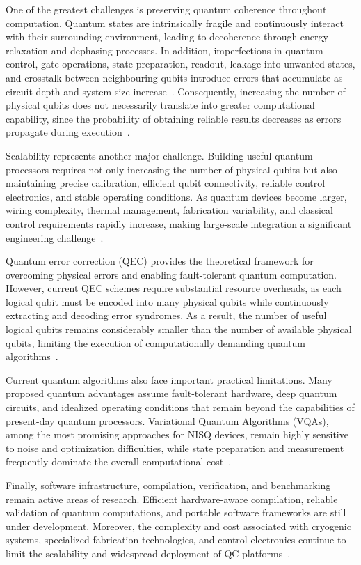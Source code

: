 One of the greatest challenges is preserving quantum coherence throughout computation. Quantum states are intrinsically fragile and continuously interact with their surrounding environment, leading to decoherence through energy relaxation and dephasing processes. In addition, imperfections in quantum control, gate operations, state preparation, readout, leakage into unwanted states, and crosstalk between neighbouring qubits introduce errors that accumulate as circuit depth and system size increase~\cite{deLeon2021}. Consequently, increasing the number of physical qubits does not necessarily translate into greater computational capability, since the probability of obtaining reliable results decreases as errors propagate during execution~\cite{Oukaira2025}.

Scalability represents another major challenge. Building useful quantum processors requires not only increasing the number of physical qubits but also maintaining precise calibration, efficient qubit connectivity, reliable control electronics, and stable operating conditions. As quantum devices become larger, wiring complexity, thermal management, fabrication variability, and classical control requirements rapidly increase, making large-scale integration a significant engineering challenge~\cite{deLeon2021,Croot2025}.

Quantum error correction (QEC) provides the theoretical framework for overcoming physical errors and enabling fault-tolerant quantum computation. However, current QEC schemes require substantial resource overheads, as each logical qubit must be encoded into many physical qubits while continuously extracting and decoding error syndromes. As a result, the number of useful logical qubits remains considerably smaller than the number of available physical qubits, limiting the execution of computationally demanding quantum algorithms~\cite{Erol2025,Palsberg2026,Shor1995,KITAEV20032}.

Current quantum algorithms also face important practical limitations. Many proposed quantum advantages assume fault-tolerant hardware, deep quantum circuits, and idealized operating conditions that remain beyond the capabilities of present-day quantum processors. Variational Quantum Algorithms (VQAs), among the most promising approaches for NISQ devices, remain highly sensitive to noise and optimization difficulties, while state preparation and measurement frequently dominate the overall computational cost~\cite{Wang2026,Raseena2025}.

Finally, software infrastructure, compilation, verification, and benchmarking remain active areas of research. Efficient hardware-aware compilation, reliable validation of quantum computations, and portable software frameworks are still under development. Moreover, the complexity and cost associated with cryogenic systems, specialized fabrication technologies, and control electronics continue to limit the scalability and widespread deployment of QC platforms~\cite{Palsberg2026,Croot2025,Oukaira2025}.

